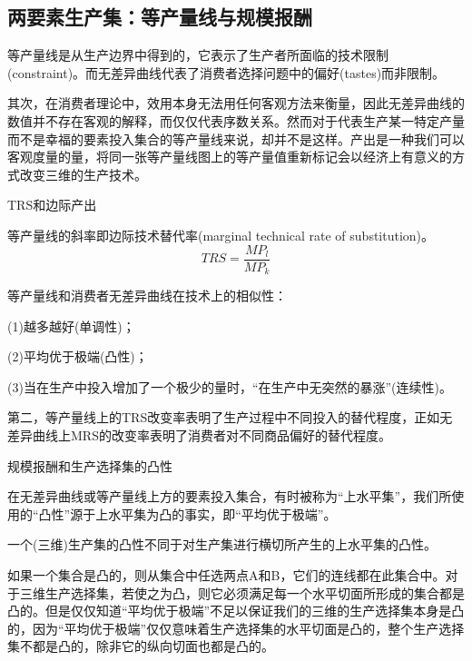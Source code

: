 \documentclass{article}
\begin{document}
\subsection{两要素生产集：等产量线与规模报酬}
等产量线是从生产边界中得到的，它表示了生产者所面临的技术限制(constraint)。而无差异曲线代表了消费者选择问题中的偏好(tastes)而非限制。

其次，在消费者理论中，效用本身无法用任何客观方法来衡量，因此无差异曲线的数值并不存在客观的解释，而仅仅代表序数关系。然而对于代表生产某一特定产量而不是幸福的要素投入集合的等产量线来说，却并不是这样。产出是一种我们可以客观度量的量，将同一张等产量线图上的等产量值重新标记会以经济上有意义的方式改变三维的生产技术。

\hspace*{\fill}

TRS和边际产出

等产量线的斜率即边际技术替代率(marginal technical rate of substitution)。
\[
TRS=\frac{MP_l}{MP_k}
\]

\hspace*{\fill}

等产量线和消费者无差异曲线在技术上的相似性：

(1)越多越好(单调性)；

(2)平均优于极端(凸性)；

(3)当在生产中投入增加了一个极少的量时，“在生产中无突然的暴涨”(连续性)。

第二，等产量线上的TRS改变率表明了生产过程中不同投入的替代程度，正如无差异曲线上MRS的改变率表明了消费者对不同商品偏好的替代程度。

\hspace*{\fill}

规模报酬和生产选择集的凸性

在无差异曲线或等产量线上方的要素投入集合，有时被称为“上水平集”，我们所使用的“凸性”源于上水平集为凸的事实，即“平均优于极端”。

一个(三维)生产集的凸性不同于对生产集进行横切所产生的上水平集的凸性。

如果一个集合是凸的，则从集合中任选两点A和B，它们的连线都在此集合中。对于三维生产选择集，若使之为凸，则它必须满足每一个水平切面所形成的集合都是凸的。但是仅仅知道“平均优于极端”不足以保证我们的三维的生产选择集本身是凸的，因为“平均优于极端”仅仅意味着生产选择集的水平切面是凸的，整个生产选择集不都是凸的，除非它的纵向切面也都是凸的。
\end{document}
